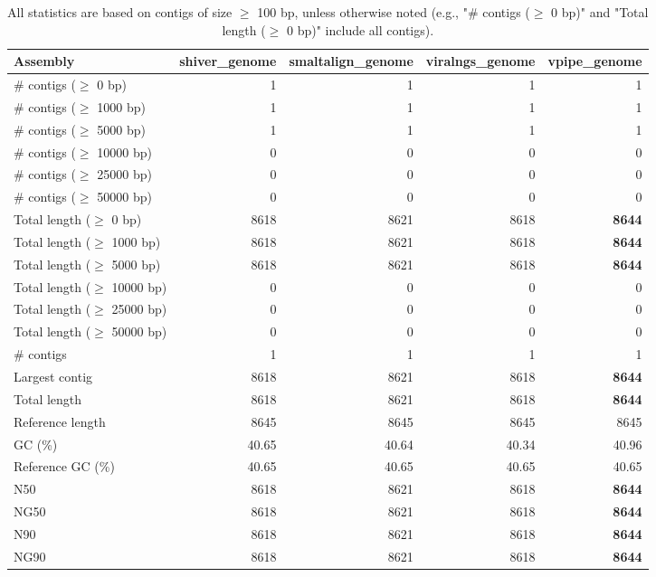 \documentclass[12pt,a4paper]{article}
\begin{document}
\begin{table}[ht]
\begin{center}
\caption{All statistics are based on contigs of size $\geq$ 100 bp, unless otherwise noted (e.g., "\# contigs ($\geq$ 0 bp)" and "Total length ($\geq$ 0 bp)" include all contigs).}
\begin{tabular}{|l*{4}{|r}|}
\hline
Assembly & shiver\_genome & smaltalign\_genome & viralngs\_genome & vpipe\_genome \\ \hline
\# contigs ($\geq$ 0 bp) & 1 & 1 & 1 & 1 \\ \hline
\# contigs ($\geq$ 1000 bp) & 1 & 1 & 1 & 1 \\ \hline
\# contigs ($\geq$ 5000 bp) & 1 & 1 & 1 & 1 \\ \hline
\# contigs ($\geq$ 10000 bp) & 0 & 0 & 0 & 0 \\ \hline
\# contigs ($\geq$ 25000 bp) & 0 & 0 & 0 & 0 \\ \hline
\# contigs ($\geq$ 50000 bp) & 0 & 0 & 0 & 0 \\ \hline
Total length ($\geq$ 0 bp) & 8618 & 8621 & 8618 & {\bf 8644} \\ \hline
Total length ($\geq$ 1000 bp) & 8618 & 8621 & 8618 & {\bf 8644} \\ \hline
Total length ($\geq$ 5000 bp) & 8618 & 8621 & 8618 & {\bf 8644} \\ \hline
Total length ($\geq$ 10000 bp) & 0 & 0 & 0 & 0 \\ \hline
Total length ($\geq$ 25000 bp) & 0 & 0 & 0 & 0 \\ \hline
Total length ($\geq$ 50000 bp) & 0 & 0 & 0 & 0 \\ \hline
\# contigs & 1 & 1 & 1 & 1 \\ \hline
Largest contig & 8618 & 8621 & 8618 & {\bf 8644} \\ \hline
Total length & 8618 & 8621 & 8618 & {\bf 8644} \\ \hline
Reference length & 8645 & 8645 & 8645 & 8645 \\ \hline
GC (\%) & 40.65 & 40.64 & 40.34 & 40.96 \\ \hline
Reference GC (\%) & 40.65 & 40.65 & 40.65 & 40.65 \\ \hline
N50 & 8618 & 8621 & 8618 & {\bf 8644} \\ \hline
NG50 & 8618 & 8621 & 8618 & {\bf 8644} \\ \hline
N90 & 8618 & 8621 & 8618 & {\bf 8644} \\ \hline
NG90 & 8618 & 8621 & 8618 & {\bf 8644} \\ \hline

\end{tabular}
\end{center}
\end{table}
\end{document}
